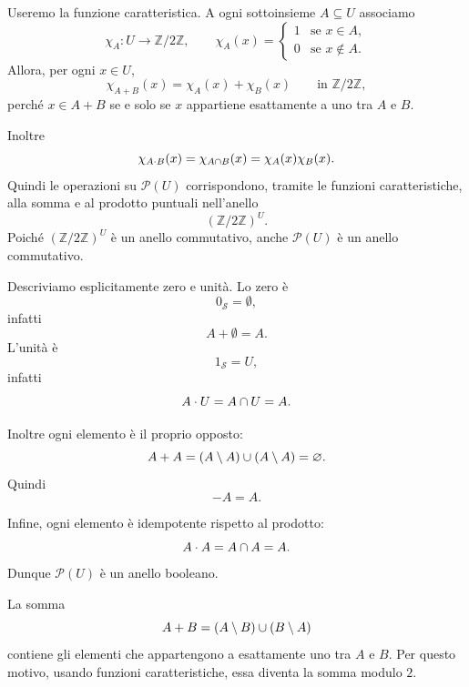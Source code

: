 \documentclass[a4paper]{article}
\begin{document}
\begin{radioactive}
\begin{snippetsolution}{}
    Useremo la funzione caratteristica. A ogni sottoinsieme \(A\subseteq U\) associamo
    \[
        \chi_A\colon U\to \mathbb{Z}/2\mathbb{Z},
        \qquad
        \chi_A(x)=
        \begin{cases}
            1 & \text{se } x\in A,\\
            0 & \text{se } x\notin A.
        \end{cases}
    \]
    Allora, per ogni \(x\in U\),
    \[
        \chi_{A+B}(x)=\chi_A(x)+\chi_B(x)
        \qquad
        \text{in } \mathbb{Z}/2\mathbb{Z},
    \]
    perché \(x\in A+B\) se e solo se \(x\) appartiene esattamente a uno tra \(A\) e \(B\).

    Inoltre
    \[
        \chi_{A\cdot B}(x)=\chi_{A\cap B}(x)=\chi_A(x)\chi_B(x).
    \]
    Quindi le operazioni su \(\mathcal{P}(U)\) corrispondono, tramite le funzioni caratteristiche, alla somma e al prodotto puntuali nell'anello
    \[
        (\mathbb{Z}/2\mathbb{Z})^U.
    \]
    Poiché \((\mathbb{Z}/2\mathbb{Z})^U\) è un anello commutativo, anche \(\mathcal{P}(U)\) è un anello commutativo.

    Descriviamo esplicitamente zero e unità. Lo zero è
    \[
        0_{\mathcal{S}}=\emptyset,
    \]
    infatti
    \[
        A+\emptyset=A.
    \]
    L'unità è
    \[
        1_{\mathcal{S}}=U,
    \]
    infatti
    \[
        A\cdot U=A\cap U=A.
    \]

    Inoltre ogni elemento è il proprio opposto:
    \[
        A+A=(A\setminus A)\cup(A\setminus A)=\varnothing.
    \]
    Quindi
    \[
        -A=A.
    \]

    Infine, ogni elemento è idempotente rispetto al prodotto:
    \[
        A\cdot A=A\cap A=A.
    \]
    Dunque \(\mathcal{P}(U)\) è un anello booleano.
\end{snippetsolution}
\end{radioactive}

\begin{radioactive}
\begin{snippetremark}{}
    La somma
    \[
        A+B=(A\setminus B)\cup(B\setminus A)
    \]
    contiene gli elementi che appartengono a esattamente uno tra \(A\) e \(B\). Per questo motivo, usando funzioni caratteristiche, essa diventa la somma modulo \(2\).
\end{snippetremark}
\end{radioactive}
\end{document}
